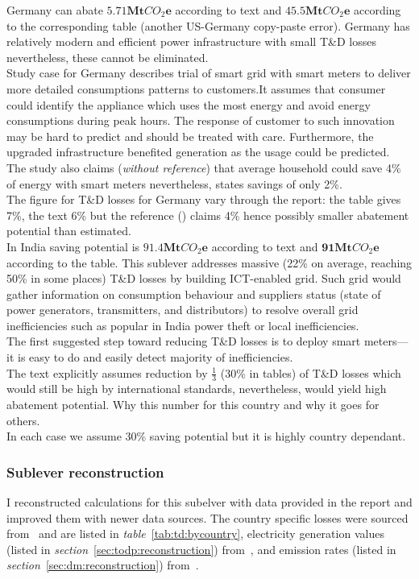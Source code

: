 \documentclass[11pt, twocolumn]{article}
\begin{document}
Germany can abate $\mathbf{5.71} \mathbf{Mt}CO_2\mathbf{e}$ according to text and $\mathbf{45.5} \mathbf{Mt}CO_2\mathbf{e}$ according to the corresponding table (another US-Germany copy-paste error). Germany has relatively modern and efficient power infrastructure with small T\&D losses nevertheless, these cannot be eliminated.\\
Study case for Germany describes trial of smart grid with smart meters to deliver more detailed consumptions patterns to customers.It assumes that consumer could identify the appliance which uses the most energy and avoid energy consumptions during peak hours. The response of customer to such innovation may be hard to predict and should be treated with care. Furthermore, the upgraded infrastructure benefited generation as the usage could be predicted. The study also claims (\emph{without reference}) that average household could save 4\% of energy with smart meters nevertheless, \citep{bbc:smartmeters} states savings of only 2\%.\\
The figure for T\&D losses for Germany vary through the report: the table gives 7\%, the text 6\% but the reference (\citep{teri:td}) claims 4\% hence possibly smaller abatement potential than estimated.\\


In India saving potential is $\mathbf{91.4} \mathbf{Mt}CO_2\mathbf{e}$ according to text and $\mathbf{91} \mathbf{Mt}CO_2\mathbf{e}$ according to the table. This sublever addresses massive (22\% on average, reaching 50\% in some places) T\&D losses by building ICT-enabled grid. Such grid would gather information on consumption behaviour and suppliers status (state of power generators, transmitters, and distributors) to resolve overall grid inefficiencies such as popular in India power theft or local inefficiencies.\\
The first suggested step toward reducing T\&D losses is to deploy smart meters---it is easy to do and easily detect majority of inefficiencies.\\
The text explicitly assumes reduction by $\frac{1}{3}$ (30\% in tables) of T\&D losses which would still be high by international standards, nevertheless, would yield high abatement potential. Why this number for this country and why it goes for others.\\

In each case we assume 30\% saving potential but it is highly country dependant.\\

\subsubsection{Sublever reconstruction\label{sec:pgo:reconstruction}}
I reconstructed calculations for this subelver with data provided in the report and improved them with newer data sources. The country specific losses were sourced from~\citep{wb:2011:td} and are listed in \emph{table}~\ref{tab:td:bycountry}, electricity generation values (listed in \emph{section}~\ref{sec:todp:reconstruction}) from~\citep{eia2011}, and emission rates (listed in \emph{section}~\ref{sec:dm:reconstruction}) from~\citep{iea2012co2}.\\
\end{document}
